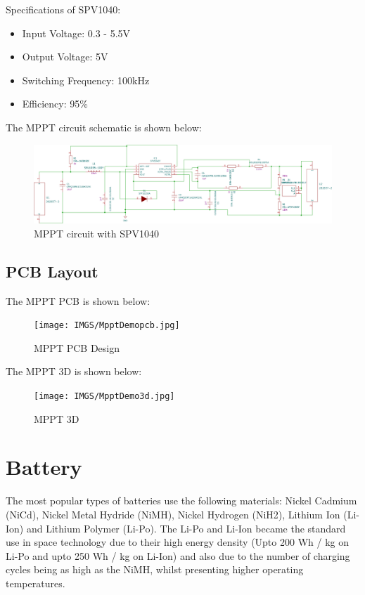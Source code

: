 Specifications of  SPV1040:
	\begin{itemize}
	\item Input Voltage: 0.3 - 5.5V
	\item Output Voltage: 5V
	\item Switching Frequency: 100kHz
	\item Efficiency: 95\%
\end{itemize}
The MPPT circuit schematic is shown below:
 	\begin{figure}[h]
	\centering
	\includegraphics[width=\columnwidth]{IMGS/MpptDemoBoard.pdf}
	\caption{MPPT circuit with SPV1040}
	\label{fig:mpptsch}
\end{figure}
\subsection[mpptpcb]{PCB Layout}
The MPPT PCB is shown below:
\begin{figure}[H]
	\centering
	\texttt{[image: IMGS/MpptDemopcb.jpg]}
	\caption{MPPT PCB Design}
	\label{fig:mpptpcb}
\end{figure}

The MPPT 3D is shown below:
\begin{figure}[H]
	\centering
	\texttt{[image: IMGS/MpptDemo3d.jpg]}
	\caption{MPPT 3D}
	\label{fig:mppt3d}
\end{figure}





\section[Battery]{Battery}
The most popular types of batteries use the following materials: Nickel Cadmium
(NiCd), Nickel Metal Hydride (NiMH), Nickel Hydrogen (NiH2), Lithium Ion
(Li-Ion) and Lithium Polymer (Li-Po). The Li-Po and Li-Ion became the standard use in space technology due to their
high energy density (Upto 200 Wh / kg on Li-Po and upto 250 Wh / kg on Li-Ion) and also due to
the number of charging cycles being as high as the NiMH, whilst presenting higher
operating temperatures. 
